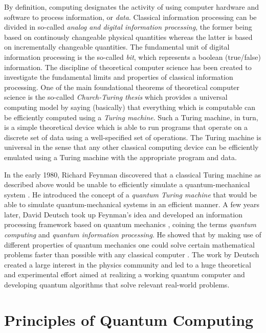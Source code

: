 By definition, computing designates the activity of using computer hardware and software to process information, or {\it data}. Classical information processing can be divided in so-called {\it analog and digital information processing}, the former being based on continously changeable physical quantities whereas the latter is based on incrementally changeable quantities. The fundamental unit of digital information processing is the so-called {\it bit}, which represents a boolean (true/false) information. The discipline of theoretical computer science has been created to investigate the fundamental limits and properties of classical information processing. One of the main foundational theorems of theoretical computer science is the so-called {\it Church-Turing thesis} which provides a universal computing model by saying (basically) that everything which is computable can be efficiently computed using a {\it Turing machine}. Such a Turing machine, in turn, is a simple theoretical device which is able to run programs that operate on a discrete set of data using a well-specified set of operations. The Turing machine is universal in the sense that any other classical computing device can be efficiently emulated using a Turing machine with the appropriate program and data.

\smallskip

In the early 1980, Richard Feynman discovered that a classical Turing machine as described above would be unable to efficiently simulate a quantum-mechanical system \citep{feynman_simulating_1982}. He introduced the concept of a {\it quantum Turing machine} that would be able to simulate quantum-mechanical systems in an efficient manner. A few years later, David Deutsch took up Feynman's idea and developed an information processing framework based on quantum mechanics \citep{deutsch_quantum_1985}, coining the terms {\it quantum computing} and {\it quantum information processing}. He showed that by making use of different properties of quantum mechanics one could solve certain mathematical problems faster than possible with any classical computer \citep{deutsch_quantum_1985}. The work by Deutsch created a large interest in the physics community and led to a huge theoretical and experimental effort aimed at realizing a working quantum computer and developing quantum algorithms that solve relevant real-world problems.

\section{Principles of Quantum Computing}

